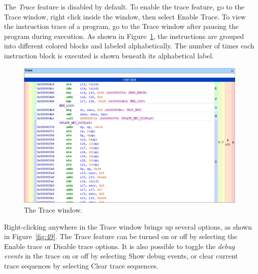 \documentclass[11pt, twoside, pdftex]{article}
\begin{document}
The {\it Trace} feature is disabled by default. To enable 
the trace feature, go to the Trace window, right click inside
the window, then select \textsf{Enable Trace}. To view the 
instruction trace of a program, go to the Trace window
after pausing the program during execution. As shown in 
Figure~\ref{fig:48}, the instructions are grouped into
different colored blocks and labeled alphabetically. 
The number of times each instruction block is executed is
shown beneath its alphabetical label.

\begin{figure}[H]
   \begin{center}
      \includegraphics[scale=0.5]{screenshots/figure48.png}
   \end{center}
   \caption{The Trace window.}
	 \label{fig:48}
\end{figure}

Right-clicking anywhere in the Trace window brings up
several options, as shown in Figure~\ref{fig:49}.
The Trace feature can be turned on or off by selecting
the \textsf{Enable trace} or \textsf{Disable trace} options. 
It is also possible to toggle the {\it debug events} in the 
trace on or off by selecting \textsf{Show debug events}, or
clear current trace sequences by selecting 
\textsf{Clear trace sequences}. 
\end{document}
